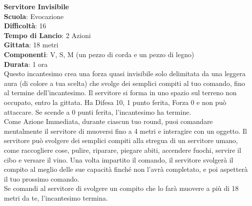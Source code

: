 \begin{multicols}{2}
\medskip\textbf{Servitore Invisibile}\\
\textbf{Scuola}: Evocazione\\
\textbf{Difficoltà}: 16\\
\textbf{Tempo di Lancio}: 2 Azioni\\
\textbf{Gittata}: 18 metri\\
\textbf{Componenti}: V, S, M (un pezzo di corda e un pezzo di legno)\\
\textbf{Durata}: 1 ora\\
Questo incantesimo crea una forza quasi invisibile solo delimitata da una leggera aura (di colore a tua scelta) che svolge dei semplici compiti al tuo comando, fino al termine dell'incantesimo. Il servitore si forma in uno spazio sul terreno non occupato, entro la gittata. Ha Difesa 10, 1 punto ferita, Forza 0 e non può attaccare. Se scende a 0 punti ferita, l'incantesimo ha termine.\\
Come Azione Immediata, durante ciascun tuo round, puoi comandare mentalmente il servitore di muoversi fino a 4 metri e interagire con un oggetto. Il servitore può svolgere dei semplici compiti alla stregua di un servitore umano, come raccogliere cose, pulire, riparare, piegare abiti, accendere fuochi, servire il cibo e versare il vino. Una volta impartito il comando, il servitore svolgerà il compito al meglio delle sue capacità finché non l'avrà completato, e poi aspetterà il tuo prossimo comando. \\
Se comandi al servitore di svolgere un compito che lo farà muovere a più di 18 metri da te, l'incantesimo termina.


\end{multicols}
